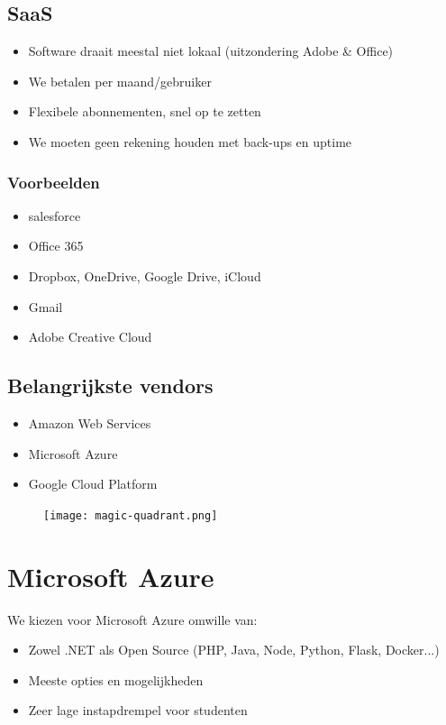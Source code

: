 \documentclass{article}
\begin{document}
\subsection{SaaS}
\begin{itemize}
    \item Software draait meestal niet lokaal (uitzondering Adobe \& Office)
    \item We betalen per maand/gebruiker
    \item Flexibele abonnementen, snel op te zetten
    \item We moeten geen rekening houden met back-ups en uptime
\end{itemize}

\subsubsection{Voorbeelden}
\begin{itemize}
    \item salesforce
    \item Office 365
    \item Dropbox, OneDrive, Google Drive, iCloud
    \item Gmail
    \item Adobe Creative Cloud
\end{itemize}

\subsection{Belangrijkste vendors}
\begin{itemize}
    \item Amazon Web Services
    \item Microsoft Azure
    \item Google Cloud Platform
\end{itemize}

\begin{figure}[H]
    \centering
    \texttt{[image: magic-quadrant.png]}
    \caption{}
\end{figure}



\section{Microsoft Azure}
We kiezen voor Microsoft Azure omwille van:
\begin{itemize}
    \item Zowel .NET als Open Source (PHP, Java, Node, Python, Flask, Docker...)
    \item Meeste opties en mogelijkheden
    \item Zeer lage instapdrempel voor studenten
\end{itemize}
\end{document}
